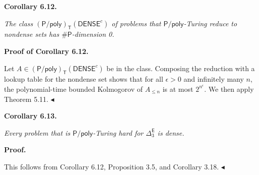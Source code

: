 

\par\medskip\noindent\textbf{
\textbf{Corollary 6.12}\textbf{.}
}\par



\emph{The class $({\mathsf{P}/\mathsf{poly}})_{\mathsf{T}}(\mathsf{DENSE}^{c})$ of problems that ${\mathsf{P}/\mathsf{poly}}$-Turing reduce to nondense sets has ${\mathsf{\#}\mathsf{P}}$-dimension 0.}\par






\par\medskip\noindent\textbf{Proof of Corollary 6.12.}\par




Let $A\in({\mathsf{P}/\mathsf{poly}})_{\mathsf{T}}(\mathsf{DENSE}^{c})$ be in the class.
Composing the reduction with a lookup table for the nondense set shows that for all $\epsilon>0$ and infinitely many $n$, the polynomial-time bounded Kolmogorov of $A_{\leq n}$ is at most $2^{n^{\epsilon}}$. We then apply Theorem 5.11.
$\blacktriangleleft$\par





\par\medskip\noindent\textbf{
\textbf{Corollary 6.13}\textbf{.}
}\par



\emph{Every problem that is ${\mathsf{P}/\mathsf{poly}}$-Turing hard for $\Delta^{\mathsf{E}}_{3}$ is dense.}\par







\par\medskip\noindent\textbf{Proof.}\par




This follows from
Corollary 6.12,
Proposition 3.5, and
Corollary 3.18.
$\blacktriangleleft$\par







